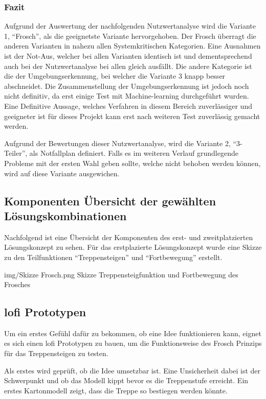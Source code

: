 \subsubsection*{Fazit}
Aufgrund der Auswertung der nachfolgenden Nutzwertanalyse wird die Variante 1, ``Frosch'', als die geeignetste Variante hervorgehoben. Der Frosch überragt die anderen Varianten in nahezu allen Systemkritischen Kategorien. Eine Ausnahmen ist der Not-Aus, welcher bei allen Varianten identisch ist und dementsprechend auch bei der Nutzwertanalyse bei allen gleich ausfällt. Die andere Kategorie ist die der Umgebungserkennung, bei welcher die Variante 3 knapp besser abschneidet. Die Zusammenstellung der Umgebungserkennung ist jedoch noch nicht definitiv, da erst einige Test mit Machine-learning durchgeführt wurden. Eine Definitive Aussage, welches Verfahren in diesem Bereich zuverlässiger und geeigneter ist für dieses Projekt kann erst nach weiteren Test zuverlässig gemacht werden.

Aufgrund der Bewertungen dieser Nutzwertanalyse, wird die Variante 2, ``3-Teiler'', als Notfallplan definiert. Falls es im weiteren Verlauf grundlegende Probleme mit der ersten Wahl geben sollte, welche nicht behoben werden können, wird auf diese Variante ausgewichen.

\subsection*{Komponenten Übersicht der gewählten Lösungskombinationen}
Nachfolgend ist eine Übersicht der Komponenten des erst- und zweitplatzierten Lösungskonzept zu sehen. Für das erstplazierte Lösungskonzept wurde eine Skizze zu den Teilfunktionen ``Treppensteigen'' und ``Fortbewegung'' erstellt.

\vspace{2cm}

\image
   {img/Skizze Frosch.png}
   {Skizze Treppensteigfunktion und Fortbewegung des Frosches}

\subsection*{\acrshort{lofi} Prototypen}
Um ein erstes Gefühl dafür zu bekommen, ob eine Idee funktionieren kann, eignet es 
sich einen \acrfull{lofi} Prototypen zu bauen, um die Funktionsweise
des \glqq Frosch\grqq{} Prinzips für das Treppensteigen zu testen.

Als erstes wird geprüft, ob die Idee umsetzbar ist.
Eine Unsicherheit dabei ist der Schwerpunkt und ob das Modell kippt
bevor es die Treppenstufe erreicht. Ein erstes Kartonmodell zeigt,
dass die Treppe so bestiegen werden könnte.

